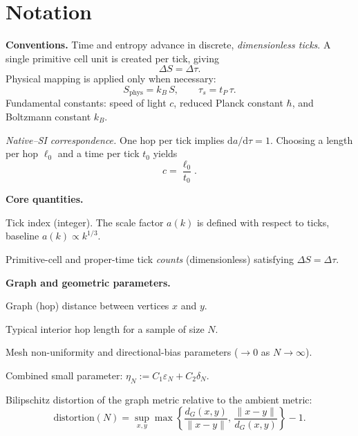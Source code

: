 \section*{Notation}

\noindent\textbf{Conventions.}  
Time and entropy advance in discrete, \emph{dimensionless ticks}. 
A single primitive cell unit is created per tick, giving
\[
  \Delta S = \Delta \tau.
\]
Physical mapping is applied only when necessary:
\[
  S_{\mathrm{phys}} = k_B\,S, \qquad
  \tau_s = t_P\,\tau.
\]
Fundamental constants: speed of light \(c\), reduced Planck constant \(\hbar\), and Boltzmann constant \(k_B\).

\smallskip
\noindent\textit{Native--SI correspondence.}  
One hop per tick implies \(\mathrm{d}a/\mathrm{d}\tau = 1\).  
Choosing a length per hop \(\ell_0\) and a time per tick \(t_0\) yields
\[
  c = \frac{\ell_0}{t_0}.
\]

\bigskip
\noindent\textbf{Core quantities.}
\begin{description}[leftmargin=2.4em,labelsep=0.8em]
  \item[\(k\)] Tick index (integer). The scale factor \(a(k)\) is defined with respect to ticks, baseline \(a(k)\propto k^{1/3}\).
  \item[\(\Delta S,\,\Delta\tau\)] Primitive-cell and proper-time tick \emph{counts} (dimensionless) satisfying \(\Delta S=\Delta\tau\).
\end{description}

\noindent\textbf{Graph and geometric parameters.}
\begin{description}[leftmargin=2.4em,labelsep=0.8em]
  \item[\(d_G(x,y)\)] Graph (hop) distance between vertices \(x\) and \(y\).
  \item[\(\ell_N\)] Typical interior hop length for a sample of size \(N\).
  \item[\(\varepsilon_N,\,\delta_N\)] Mesh non-uniformity and directional-bias parameters (\(\to 0\) as \(N\to\infty\)).
  \item[\(\eta_N\)] Combined small parameter: \(\eta_N := C_1\varepsilon_N + C_2\delta_N.\)
  \item[\(\mathrm{distortion}(N)\)] Bilipschitz distortion of the graph metric relative to the ambient metric:
  \[
    \mathrm{distortion}(N)
      = \sup_{x,y}
        \max\!\left\{
          \frac{d_G(x,y)}{\|x-y\|},\,
          \frac{\|x-y\|}{d_G(x,y)}
        \right\}-1.
  \]
\end{description}

